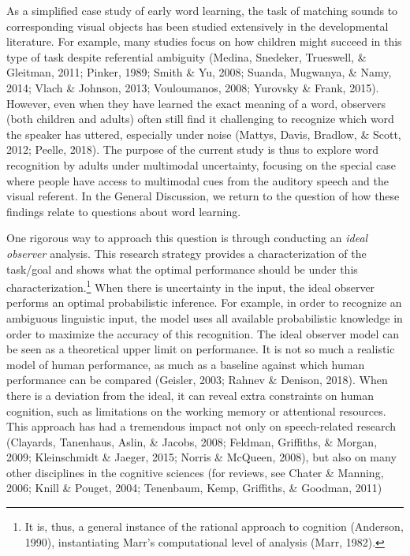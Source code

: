 \documentclass[english,,man,floatsintext]{apa6}
\let\rmarkdownfootnote\footnote%
\def\footnote{\protect\rmarkdownfootnote}
\theoremstyle{definition}
\theoremstyle{definition}
\theoremstyle{definition}
\theoremstyle{remark}
\begin{document}
As a simplified case study of early word learning, the task of matching
sounds to corresponding visual objects has been studied extensively in
the developmental literature. For example, many studies focus on how
children might succeed in this type of task despite referential
ambiguity (Medina, Snedeker, Trueswell, \& Gleitman, 2011; Pinker, 1989;
Smith \& Yu, 2008; Suanda, Mugwanya, \& Namy, 2014; Vlach \& Johnson,
2013; Vouloumanos, 2008; Yurovsky \& Frank, 2015). However, even when
they have learned the exact meaning of a word, observers (both children
and adults) often still find it challenging to recognize which word the
speaker has uttered, especially under noise (Mattys, Davis, Bradlow, \&
Scott, 2012; Peelle, 2018). The purpose of the current study is thus to
explore word recognition by adults under multimodal uncertainty,
focusing on the special case where people have access to multimodal cues
from the auditory speech and the visual referent. In the General
Discussion, we return to the question of how these findings relate to
questions about word learning.

One rigorous way to approach this question is through conducting an
\emph{ideal observer} analysis. This research strategy provides a
characterization of the task/goal and shows what the optimal performance
should be under this characterization.\footnote{It is, thus, a general
  instance of the rational approach to cognition (Anderson, 1990),
  instantiating Marr's computational level of analysis (Marr, 1982).}
When there is uncertainty in the input, the ideal observer performs an
optimal probabilistic inference. For example, in order to recognize an
ambiguous linguistic input, the model uses all available probabilistic
knowledge in order to maximize the accuracy of this recognition. The
ideal observer model can be seen as a theoretical upper limit on
performance. It is not so much a realistic model of human performance,
as much as a baseline against which human performance can be compared
(Geisler, 2003; Rahnev \& Denison, 2018). When there is a deviation from
the ideal, it can reveal extra constraints on human cognition, such as
limitations on the working memory or attentional resources. This
approach has had a tremendous impact not only on speech-related research
(Clayards, Tanenhaus, Aslin, \& Jacobs, 2008; Feldman, Griffiths, \&
Morgan, 2009; Kleinschmidt \& Jaeger, 2015; Norris \& McQueen, 2008),
but also on many other disciplines in the cognitive sciences (for
reviews, see Chater \& Manning, 2006; Knill \& Pouget, 2004; Tenenbaum,
Kemp, Griffiths, \& Goodman, 2011)
\end{document}
